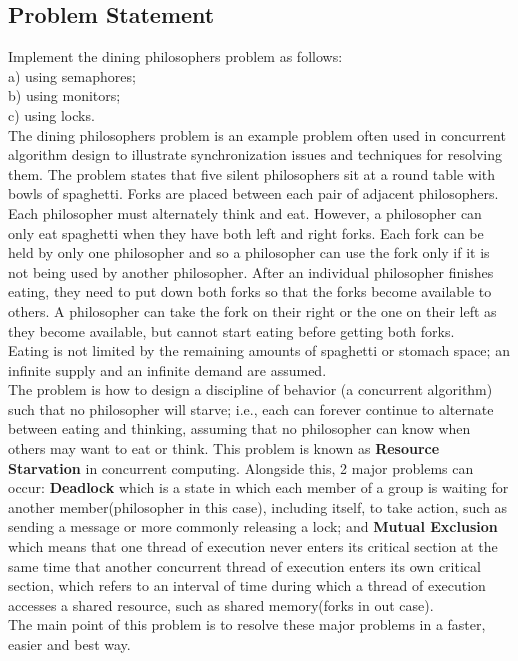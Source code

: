 \documentclass[14pt]{article}
\begin{document}
\subsection{Problem Statement}
Implement the dining philosophers problem as follows:
\\a) using semaphores;
\\b) using monitors;
\\c) using locks.
\vspace{2.5 mm}
\\ The dining philosophers problem is an example problem often used in concurrent algorithm design to illustrate synchronization issues and techniques for resolving them. The problem states that five silent philosophers sit at a round table with bowls of spaghetti. Forks are placed between each pair of adjacent philosophers.
\vspace{2.5 mm}
\\Each philosopher must alternately think and eat. However, a philosopher can only eat spaghetti when they have both left and right forks. Each fork can be held by only one philosopher and so a philosopher can use the fork only if it is not being used by another philosopher. After an individual philosopher finishes eating, they need to put down both forks so that the forks become available to others. A philosopher can take the fork on their right or the one on their left as they become available, but cannot start eating before getting both forks.
\vspace{2.5 mm}
\\Eating is not limited by the remaining amounts of spaghetti or stomach space; an infinite supply and an infinite demand are assumed.
\vspace{2.5 mm}
\\The problem is how to design a discipline of behavior (a concurrent algorithm) such that no philosopher will starve; i.e., each can forever continue to alternate between eating and thinking, assuming that no philosopher can know when others may want to eat or think. This problem is known as \textbf{Resource Starvation} in concurrent computing. Alongside this, 2 major problems can occur: \textbf{Deadlock} which is a state in which each member of a group is waiting for another member(philosopher in this case), including itself, to take action, such as sending a message or more commonly releasing a lock; and \textbf{Mutual Exclusion} which means that one thread of execution never enters its critical section at the same time that another concurrent thread of execution enters its own critical section, which refers to an interval of time during which a thread of execution accesses a shared resource, such as shared memory(forks in out case).
\vspace{2.5 mm}
\\The main point of this problem is to resolve these major problems in a faster, easier and best way.
\end{document}
